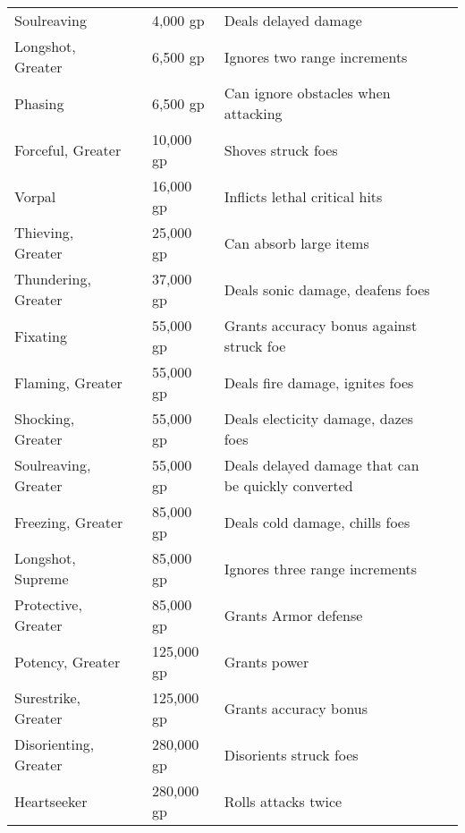 \begin{longtabuwrapper}
\begin{longtabu}{l l l X l}
Soulreaving &  & 4,000 gp & Deals delayed damage & \pageref{item:Soulreaving} \\
Longshot, Greater &  & 6,500 gp & Ignores two range increments & \pageref{item:Longshot, Greater} \\
Phasing &  & 6,500 gp & Can ignore obstacles when attacking & \pageref{item:Phasing} \\
Forceful, Greater &  & 10,000 gp & Shoves struck foes & \pageref{item:Forceful, Greater} \\
Vorpal &  & 16,000 gp & Inflicts lethal critical hits & \pageref{item:Vorpal} \\
Thieving, Greater &  & 25,000 gp & Can absorb large items & \pageref{item:Thieving, Greater} \\
Thundering, Greater &  & 37,000 gp & Deals sonic damage, deafens foes & \pageref{item:Thundering, Greater} \\
Fixating &  & 55,000 gp & Grants accuracy bonus against struck foe & \pageref{item:Fixating} \\
Flaming, Greater &  & 55,000 gp & Deals fire damage, ignites foes & \pageref{item:Flaming, Greater} \\
Shocking, Greater &  & 55,000 gp & Deals electicity damage, dazes foes & \pageref{item:Shocking, Greater} \\
Soulreaving, Greater &  & 55,000 gp & Deals delayed damage that can be quickly converted & \pageref{item:Soulreaving, Greater} \\
Freezing, Greater &  & 85,000 gp & Deals cold damage, chills foes & \pageref{item:Freezing, Greater} \\
Longshot, Supreme &  & 85,000 gp & Ignores three range increments & \pageref{item:Longshot, Supreme} \\
Protective, Greater &  & 85,000 gp & Grants  Armor defense & \pageref{item:Protective, Greater} \\
Potency, Greater &  & 125,000 gp & Grants  power & \pageref{item:Potency, Greater} \\
Surestrike, Greater &  & 125,000 gp & Grants  accuracy bonus & \pageref{item:Surestrike, Greater} \\
Disorienting, Greater &  & 280,000 gp & Disorients struck foes & \pageref{item:Disorienting, Greater} \\
Heartseeker &  & 280,000 gp & Rolls attacks twice & \pageref{item:Heartseeker} \\
\end{longtabu}
\end{longtabuwrapper}
